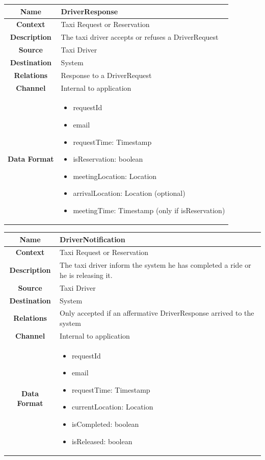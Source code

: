 \documentclass[11pt, a4paper,titlepage]{article}
\begin{document}
				\begin{tabularx}{\textwidth}{| c | X |}
					\hline
					\textbf{Name} & 
					DriverResponse
					\\
					\hline
					\textbf{Context} & 
					Taxi Request or Reservation
					\\
					\hline
					\textbf{Description} & 
					The taxi driver accepts or refuses a DriverRequest
					\\
					\hline
					\textbf{Source} &
					Taxi Driver
					\\
					\hline
					\textbf{Destination} & 
					System
					\\
					\hline
					\textbf{Relations} & 
					Response to a DriverRequest
					\\
					\hline
					\textbf{Channel} & 
					Internal to application
					\\
					\hline
					\textbf{Data Format} & 
					\begin{itemize}
						\item requestId
						\item email
						\item requestTime: Timestamp
						\item isReservation: boolean
						\item meetingLocation: Location
						\item arrivalLocation: Location (optional)
						\item meetingTime: Timestamp (only if isReservation)
					\end{itemize}
					\\
					\hline		
				\end{tabularx}
				\begin{tabularx}{\textwidth}{| c | X |}
					\hline
					\textbf{Name} & 
					DriverNotification
					\\
					\hline
					\textbf{Context} & 
					Taxi Request or Reservation
					\\
					\hline
					\textbf{Description} & 
					The taxi driver inform the system he has completed a ride or he is releasing it.
					\\
					\hline
					\textbf{Source} &
					Taxi Driver
					\\
					\hline
					\textbf{Destination} & 
					System
					\\
					\hline
					\textbf{Relations} & 
					Only accepted if an affermative DriverResponse arrived to the system
					\\
					\hline
					\textbf{Channel} & 
					Internal to application
					\\
					\hline
					\textbf{Data Format} & 
					\begin{itemize}
						\item requestId
						\item email
						\item requestTime: Timestamp
						\item currentLocation: Location
						\item isCompleted: boolean
						\item isReleased: boolean
					\end{itemize}
					\\
					\hline		
				\end{tabularx}
\end{document}
